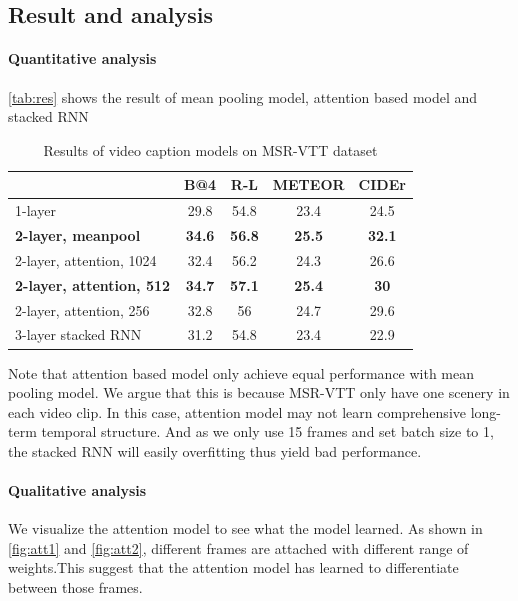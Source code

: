 \subsection{Result and analysis}
\paragraph{Quantitative analysis}
\autoref{tab:res} shows the result of mean pooling model, attention based model and stacked RNN
\begin{table}[htbp]
  \centering
  \caption{Results of video caption models on MSR-VTT dataset}
    \begin{tabular}{lcccc}
    \toprule
          & \textbf{B@4\cite{Papineni2015BLEU}} & \textbf{R-L\cite{Lin2004Automatic}} & \textbf{METEOR\cite{Lavie2007METEOR}} & \textbf{CIDEr\cite{Vedantam2015CIDEr}} \\
    \midrule
    1-layer & 29.8  & 54.8  & 23.4  & 24.5 \\
    \textbf{2-layer, meanpool} & \textbf{34.6} & \textbf{56.8} & \textbf{25.5} & \textbf{32.1} \\
    2-layer, attention, 1024 & 32.4  & 56.2  & 24.3  & 26.6 \\
    \textbf{2-layer, attention, 512} & \textbf{34.7} & \textbf{57.1} & \textbf{25.4} & \textbf{30} \\
    2-layer, attention, 256 & 32.8  & 56    & 24.7  & 29.6 \\
    3-layer stacked RNN & 31.2  & 54.8  & 23.4  & 22.9 \\
    \bottomrule
    \end{tabular}
  \label{tab:res}
\end{table}

Note that attention based model only achieve equal performance with mean pooling model. We argue that this is because MSR-VTT only have one scenery in each video clip. In this case, attention model may not learn comprehensive long-term temporal structure. And as we only use 15 frames and set batch size to 1, the stacked RNN will easily overfitting thus yield bad performance.

\paragraph{Qualitative analysis}
We visualize the attention model to see what the model learned. As shown in \autoref{fig:att1} and \autoref{fig:att2}, different frames are attached with different range of weights.This suggest that the attention model has learned to differentiate between those frames.

